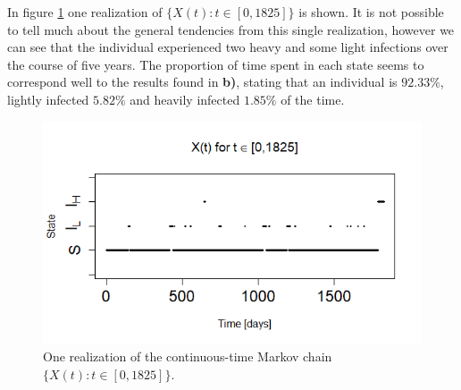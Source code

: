 In figure \ref{1realiz5yr} one realization of $\{X(t): t \in [0,1825]\}$ is shown. It is not possible to tell much about the general tendencies from this single realization, however we can see that the individual experienced two heavy and some light infections over the course of five years. The proportion of time spent in each state seems to correspond well to the results found in \textbf{b)}, stating that an individual is  $92.33\%$, lightly infected $5.82\%$ and heavily infected $1.85\%$ of the time. 

\begin{figure}
    \centering
    \includegraphics[width=130mm]{1real5yr.png}
    \caption{One realization of the continuous-time Markov chain $\{X(t):t \in [0, 1825]\}$.}
    \label{1realiz5yr}
\end{figure}



